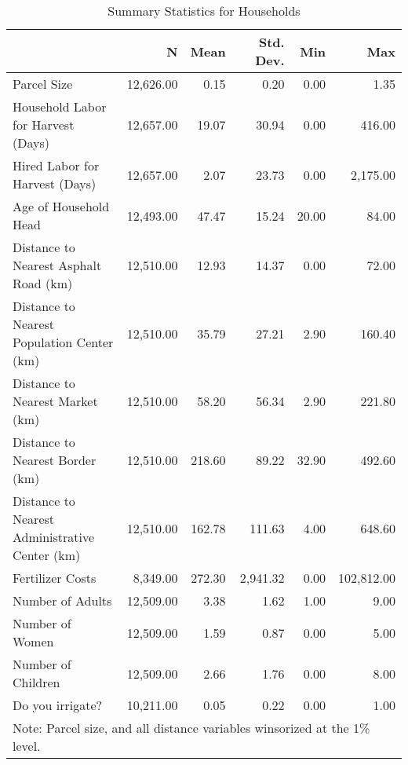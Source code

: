 \begin{table}
\caption{Summary Statistics for Households}
\label{tbl:summary}
\begin{tabular}{lrrrrr}
\toprule
{} & {N} & {Mean} & {Std. Dev.} & {Min} & {Max} \\
\midrule
Parcel Size & 12,626.00 & 0.15 & 0.20 & 0.00 & 1.35 \\
Household Labor for Harvest (Days) & 12,657.00 & 19.07 & 30.94 & 0.00 & 416.00 \\
Hired Labor for Harvest (Days) & 12,657.00 & 2.07 & 23.73 & 0.00 & 2,175.00 \\
Age of Household Head & 12,493.00 & 47.47 & 15.24 & 20.00 & 84.00 \\
Distance to Nearest Asphalt Road (km) & 12,510.00 & 12.93 & 14.37 & 0.00 & 72.00 \\
Distance to Nearest Population Center (km) & 12,510.00 & 35.79 & 27.21 & 2.90 & 160.40 \\
Distance to Nearest Market (km) & 12,510.00 & 58.20 & 56.34 & 2.90 & 221.80 \\
Distance to Nearest Border (km) & 12,510.00 & 218.60 & 89.22 & 32.90 & 492.60 \\
Distance to Nearest Administrative Center (km) & 12,510.00 & 162.78 & 111.63 & 4.00 & 648.60 \\
Fertilizer Costs & 8,349.00 & 272.30 & 2,941.32 & 0.00 & 102,812.00 \\
Number of Adults & 12,509.00 & 3.38 & 1.62 & 1.00 & 9.00 \\
Number of Women & 12,509.00 & 1.59 & 0.87 & 0.00 & 5.00 \\
Number of Children & 12,509.00 & 2.66 & 1.76 & 0.00 & 8.00 \\
Do you irrigate? & 10,211.00 & 0.05 & 0.22 & 0.00 & 1.00 \\
\bottomrule
\multicolumn{6}{l}{Note: Parcel size, and all distance variables winsorized at the 1\% level.}
\end{tabular}
\end{table}
